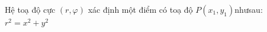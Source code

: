 \documentclass[preview]{standalone}
\begin{document}
\begin{center}
Hệ toạ độ cực $(r,\varphi)$ xác định một điểm có toạ độ $P(x_1, y_1)$nhưsau:$r^2=x^2+y^2$
\end{center}
\end{document}
